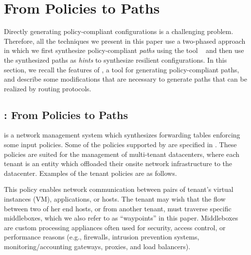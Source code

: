 \section{From Policies to Paths} \label{sec:genesis}
Directly generating policy-compliant configurations is a challenging
problem.
Therefore, all the techniques we present in this paper 
use a two-phased approach in which we first synthesize
policy-compliant \emph{paths} using the tool \genesis~\cite{genesis}
and then use the synthesized paths as \emph{hints} to synthesize resilient configurations. 
In this section, we recall the features of \genesis,
 a tool for generating policy-compliant paths, and describe
some modifications that are necessary to generate paths that
can be realized by routing protocols. 


\subsection{\genesis: From Policies to Paths} \label{sec:genesis}
\genesis is a network management
system which synthesizes forwarding tables enforcing some input policies. 
Some of the policies supported by \genesis are specified in 
. These policies are suited for the 
management of multi-tenant datacenters, where each tenant is 
an entity which offloaded their 
onsite network infrastructure to the datacenter. Examples of the 
tenant policies are as follows. 

This policy enables network communication
  between pairs of tenant's virtual instances (VM), 
  applications, or hosts.  
The tenant may wish that the flow
  between two of her end hosts, or from another tenant, must traverse
  specific middleboxes, which we also refer to as ``waypoints'' in
  this paper. Middleboxes are custom processing appliances often used
  for security, access control, or performance reasons (e.g.,
  firewalls, intrusion prevention systems, monitoring/accounting
  gateways, proxies, and load balancers). 

